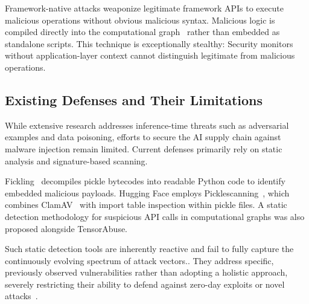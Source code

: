 
Framework-native attacks weaponize legitimate framework APIs to execute malicious operations without obvious malicious syntax\cite{zhu2025}. Malicious logic is compiled directly into the computational graph~\cite{langford2024architecturalneuralbackdoorsprinciples} rather than embedded as standalone scripts. This technique is exceptionally stealthy: Security monitors without application-layer context cannot distinguish legitimate from malicious operations.

\subsection{Existing Defenses and Their Limitations}

While extensive research addresses inference-time threats such as adversarial examples\cite{10656658, Xie_2025_CVPR} and data poisoning\cite{10646610, chen2025generalizabletargeteddatapoisoning}, efforts to secure the AI supply chain against malware injection remain limited\cite{nabeel2026deepdiveabusedl,jiang2026soktaxonomyattackvectors}. Current defenses primarily rely on static analysis and signature-based scanning.

Fickling~\cite{fickling} decompiles pickle bytecodes into readable Python code to identify embedded malicious payloads. Hugging Face employs Picklescanning~\cite{picklescanning}, which combines ClamAV~\cite{clamav} with import table inspection within pickle files. A static detection methodology for suspicious API calls in computational graphs was also proposed alongside TensorAbuse.

Such static detection tools are inherently reactive and fail to fully capture the continuously evolving spectrum of attack vectors.\cite{qian2025softwarevulnerabilityanalysisprogramming}. They address specific, previously observed vulnerabilities rather than adopting a holistic approach, severely restricting their ability to defend against zero-day exploits or novel attacks~\cite{tehrani2025llmvssasttechnical}.

